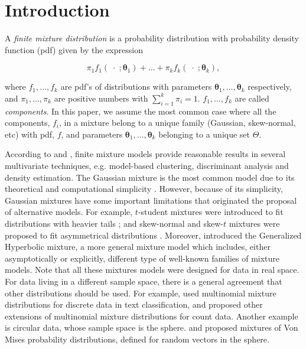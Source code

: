 \documentclass[12pt, a4paper]{article}
\newcommand{\m}[1]{\boldsymbol{#1}}
\begin{document}

\section{Introduction}

\noindent  A \emph{finite mixture distribution} is a probability distribution with probability density function (pdf) given by the expression

\begin{equation}\label{mixt}
\pi_1 f_1(\;\cdot\; ; \m\theta_1) + \dots + \pi_k f_k(\;\cdot\; ; \m\theta_k),
\end{equation}

where $f_1, \dots, f_k$ are pdf's of distributions with parameters $\m\theta_1, \dots, \m\theta_k$ respectively, and $\pi_1, \dots, \pi_k$ are positive numbers with $\sum_{i=1}^k \pi_i = 1$. $f_1, \dots, f_k$ are called \emph{components}. In this paper, we assume the most common case where all the components, $f_i$, in a mixture belong to a unique family (Gaussian, skew-normal, etc) with pdf, $f$, and parameters $\m\theta_1, \dots, \m\theta_k$ belonging to a unique set $\Theta$. 

According to \cite{scott1971clustering} and \cite{mclachlan2000finite}, finite mixture models provide reasonable results in several multivariate techniques, e.g. model-based clustering, discriminant analysis and density estimation. The Gaussian mixture is the most common model due to its theoretical and computational simplicity \citep{mclachlan2000finite}. 
However, because of its simplicity, Gaussian mixtures have some important limitations 
that originated the proposal of alternative models. For example, $t$-student mixtures were introduced to fit distributions with heavier tails \citep{andrews2012model, lee2013finite, lin2010robust}; and skew-normal and skew-$t$ mixtures were proposed to fit asymmetrical distributions \citep{lee2011fitting}. Moreover, \cite{browne2013mixture} introduced the Generalized Hyperbolic mixture, a more general mixture model which includes, either asymptotically or explicitly, different type of well-known families of mixture models. Note that all these mixtures models were designed for data in real space. For data living in a different sample space, there is a general agreement that other distributions should be used. 
For example, \cite{bickel2004multi} used multinomial mixture distributions for discrete data in text classification, and  
 \cite{bouguila2011count} proposed other extensions of multinomial mixture distributions for count data. 
Another example is circular data, whose sample space is the sphere.  \cite{banerjee2005clustering} and \cite{mardia2007protein} proposed mixtures of Von Mises probability distributions, defined for random vectors in the sphere.
\end{document}
